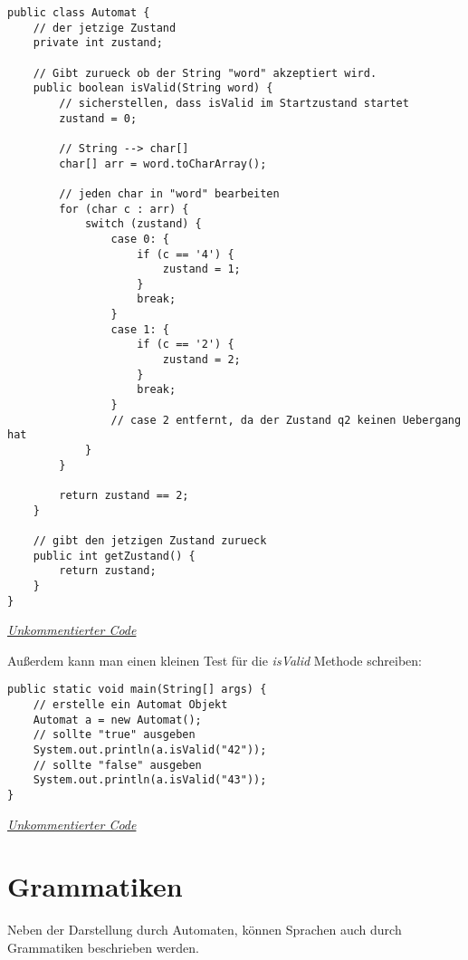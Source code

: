 \begin{center}
\begin{lstlisting}
public class Automat {
    // der jetzige Zustand
    private int zustand;

    // Gibt zurueck ob der String "word" akzeptiert wird.
    public boolean isValid(String word) {
        // sicherstellen, dass isValid im Startzustand startet
        zustand = 0;

        // String --> char[]
        char[] arr = word.toCharArray();

        // jeden char in "word" bearbeiten
        for (char c : arr) {
            switch (zustand) {
                case 0: {
                    if (c == '4') {
                        zustand = 1;
                    }
                    break;
                }
                case 1: {
                    if (c == '2') {
                        zustand = 2;
                    }
                    break;
                }
                // case 2 entfernt, da der Zustand q2 keinen Uebergang hat
            }
        }

        return zustand == 2;
    }

    // gibt den jetzigen Zustand zurueck
    public int getZustand() {
        return zustand;
    }
}
\end{lstlisting}
\href{https://raw.githubusercontent.com/tim-tm/articles/refs/heads/main/informatik-notes/code/Automat.java}{\textit{Unkommentierter Code}} \\
\end{center}

\begin{flushleft}
Außerdem kann man einen kleinen Test für die \textit{isValid} Methode schreiben:
\end{flushleft}

\begin{center}
\begin{lstlisting}
public static void main(String[] args) {
    // erstelle ein Automat Objekt
    Automat a = new Automat();
    // sollte "true" ausgeben
    System.out.println(a.isValid("42"));
    // sollte "false" ausgeben
    System.out.println(a.isValid("43"));
}
\end{lstlisting}
\href{https://raw.githubusercontent.com/tim-tm/articles/refs/heads/main/informatik-notes/code/Automat.java}{\textit{Unkommentierter Code}} \\
\end{center}

\section{Grammatiken}
\begin{flushleft}
Neben der Darstellung durch Automaten, können Sprachen auch durch Grammatiken
beschrieben werden.
\end{flushleft}

